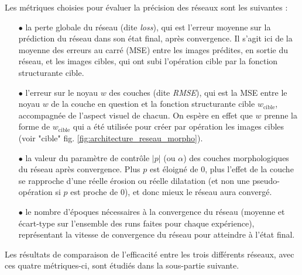 \vspace{-1.4mm}
\noindent Les métriques choisies pour évaluer la précision des réseaux sont les suivantes : 

\vspace{0.4mm}
\begin{itemize}%
    \item[$\bullet$] la perte globale du réseau (dite \textit{loss}), qui est l'erreur moyenne sur la prédiction du réseau dans son état final, après convergence. Il s'agit ici de la moyenne des erreurs au carré (MSE) entre les images prédites, en sortie du réseau, et les images cibles, qui ont subi l'opération cible par la fonction structurante cible.
    
    \item[$\bullet$] l'erreur sur le noyau $w$ des couches (dite \textit{RMSE}), qui est la MSE entre le noyau $w$ de la couche en question et la fonction structurante cible $w_{\text{cible}}$, accompagnée de l'aspect visuel de chacun. On espère en effet que $w$ prenne la forme de $w_{\text{cible}}$ qui a été utilisée pour créer par opération les images cibles (voir "cible" fig. \ref{fig:architecture_reseau_morpho}).
    
    \item[$\bullet$] la valeur du paramètre de contrôle $|p|$ (ou $\alpha$) des couches morphologiques du réseau après convergence. Plus $p$ est éloigné de $0$, plus l'effet de la couche se rapproche d'une réelle érosion ou réelle dilatation (et non une pseudo-opération si $p$ est proche de $0$), et donc mieux le réseau aura convergé.
    
    \item[$\bullet$] le nombre d'époques nécessaires à la convergence du réseau (moyenne et écart-type sur l'ensemble des runs faites pour chaque expérience), représentant la vitesse de convergence du réseau pour atteindre à l'état final.
\end{itemize}

\vspace{2.0mm}
\noindent Les résultats de comparaison de l'efficacité entre les trois différents réseaux, avec ces quatre métriques-ci, sont étudiés dans la sous-partie suivante.
